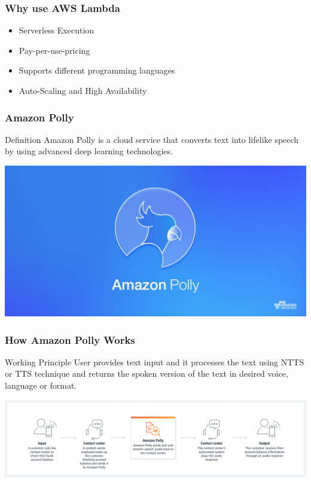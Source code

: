 \documentclass{beamer}
\begin{document}
\begin{frame}
	\frametitle{Why use AWS Lambda}
	\begin{block}{}
	\begin{itemize}
		\vspace{1ex}
		\item Serverless Execution \vspace{1ex}
		\item Pay-per-use-pricing \vspace{1ex}
		\item Supports different programming languages \vspace{1ex}
		\item Auto-Scaling and High Availability \vspace{1ex}
	\end{itemize}
	\end{block}
\end{frame}

\begin{frame}
	\frametitle{Amazon Polly}
	\begin{block}{Definition}
	Amazon Polly is a cloud service that converts text into lifelike speech by using advanced deep learning technologies.
	\end{block}
	\begin{center}
		\includegraphics[scale=0.30]{polly-social.jpg}
	\end{center}
\end{frame}

\begin{frame}
\frametitle{How Amazon Polly Works}
	\begin{block}{Working Principle}
		User provides text input and it processes the text using NTTS or TTS technique and returns the spoken version of the text in desired voice, language or format.
	\end{block}
	\begin{center}
		\includegraphics[scale=0.29]{polly-workflow.png}\\
	\end{center}
\end{frame}
\end{document}
